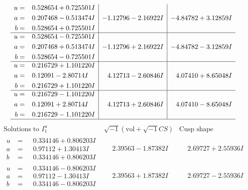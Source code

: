 \documentclass[1p]{elsarticle_modified}
\theoremstyle{definition}
\newcommand{\I}{\sqrt{-1}}
\begin{document}
$$\begin{array}{c|c|c}
\begin{aligned}
u &= \phantom{-}0.528654 + 0.725501 I \\
a &= \phantom{-}0.207468 - 0.513474 I \\
b &= \phantom{-}0.528654 + 0.725501 I\end{aligned}
 & -1.12796 - 2.16922 I & -4.84782 + 3.12859 I \\ \hline\begin{aligned}
u &= \phantom{-}0.528654 - 0.725501 I \\
a &= \phantom{-}0.207468 + 0.513474 I \\
b &= \phantom{-}0.528654 - 0.725501 I\end{aligned}
 & -1.12796 + 2.16922 I & -4.84782 - 3.12859 I \\ \hline\begin{aligned}
u &= \phantom{-}0.216729 + 1.101220 I \\
a &= \phantom{-}0.12091 - 2.80714 I \\
b &= \phantom{-}0.216729 + 1.101220 I\end{aligned}
 & \phantom{-}4.12713 - 2.60846 I & \phantom{-}4.07410 + 8.65048 I \\ \hline\begin{aligned}
u &= \phantom{-}0.216729 - 1.101220 I \\
a &= \phantom{-}0.12091 + 2.80714 I \\
b &= \phantom{-}0.216729 - 1.101220 I\end{aligned}
 & \phantom{-}4.12713 + 2.60846 I & \phantom{-}4.07410 - 8.65048 I\\
 \hline 
 \end{array}$$\newpage$$\begin{array}{c|c|c}  
\text{Solutions to }I^u_{1}& \I (\text{vol} + \sqrt{-1}CS) & \text{Cusp shape}\\
 \hline 
\begin{aligned}
u &= \phantom{-}0.334146 + 0.806203 I \\
a &= \phantom{-}0.97112 + 1.30413 I \\
b &= \phantom{-}0.334146 + 0.806203 I\end{aligned}
 & \phantom{-}2.39563 - 1.87382 I & \phantom{-}2.69727 + 2.55936 I \\ \hline\begin{aligned}
u &= \phantom{-}0.334146 - 0.806203 I \\
a &= \phantom{-}0.97112 - 1.30413 I \\
b &= \phantom{-}0.334146 - 0.806203 I\end{aligned}
 & \phantom{-}2.39563 + 1.87382 I & \phantom{-}2.69727 - 2.55936 I \\ \hline\begin{aligned}

\end{aligned}
\end{array}$$
\end{document}
